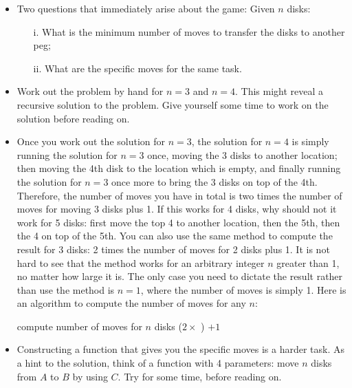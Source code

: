 \documentclass[a4paper]{article}
\begin{document}
{\begin{itemize}
\item Two questions that immediately arise about the game: Given $n$ disks:
	\begin{itemize}
	\item[i.] What is the minimum number of moves to transfer the disks to
	another peg;
	\item[ii.] What are the specific moves for the same task. 
	\end{itemize}

\item Work out the problem by hand for $n=3$ and $n=4$. This might reveal a recursive
solution to the problem. Give yourself some time to work on the solution before
reading on.

\item Once you work out the solution for $n=3$, the solution for $n=4$ is simply
running the solution for $n=3$ once,  moving the 3 disks to another location;
then moving the 4th disk to the location which is empty, and finally running the
solution for $n=3$ once more to bring the 3 disks on top of the 4th. Therefore,
the number of moves you have in total is two times the number of moves for
moving 3 disks plus 1. If this works for 4 disks, why should not it work for 5
disks: first move the top 4 to another location, then the 5th, then the 4 on top
of the 5th. You can also use the same method to compute the result for 3 disks:
2 times the number of moves for 2 disks plus 1. It is not hard to see that the
method works for an arbitrary integer $n$ greater than 1, no matter how large it
is. The only case you need to dictate the result rather than use the method is
$n=1$, where the number of moves is simply 1. Here is an algorithm to compute
the number of moves for any $n$:

\begin{ucodeframe}
\hspace{1em}
\begin{algorithmic}
 \Comment compute number of moves for $n$ disks
\State{}
\Else
\State\Return ($2\times$ ) $+1$
	\EndIf
\EndFunction
\end{algorithmic}
\end{ucodeframe}

\item Constructing a function that gives you the specific moves is a harder task. 
As a hint to the solution, think of a function with 4 parameters:
move $n$ disks from $A$ to $B$ by using $C$. Try for some time, before reading
on.




\end{itemize}}
\end{document}
